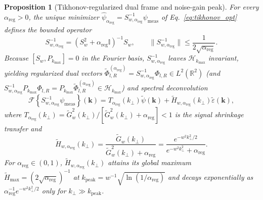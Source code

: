 \documentclass[aps,pra,reprint,nofootinbib,floatfix,longbibliography]{revtex4-2}
\newtheorem{proposition}{Proposition}
\theoremstyle{remark}
\newcommand{\norm}[1]{\lVert #1 \rVert}
\begin{document}
\begin{proposition}[Tikhonov-regularized dual frame and noise-gain peak]
\label{prop:tikhonov_dual}
For every $\alpha_{\mathrm{reg}} > 0$, the unique minimizer $\hat{\psi}_{\alpha_{\mathrm{reg}}} = S_{w,\alpha_{\mathrm{reg}}}^{-1}\psi_{\mathrm{meas}}$ of Eq.~\eqref{eq:tikhonov_opt} defines the bounded operator
\begin{equation}
S_{w,\alpha_{\mathrm{reg}}}^{-1} = \left(S_w^2 + \alpha_{\mathrm{reg}}\mathbb{I}\right)^{-1} S_w, \qquad \norm{S_{w,\alpha_{\mathrm{reg}}}^{-1}} \le \frac{1}{2\sqrt{\alpha_{\mathrm{reg}}}}.
\label{eq:tikhonov_op_def}
\end{equation}
Because $[S_w, P_{k_{\max}}] = 0$ in the Fourier basis, $S_{w,\alpha_{\mathrm{reg}}}^{-1}$ leaves $\mathcal{H}_{k_{\max}}$ invariant, yielding regularized dual vectors $\widetilde{\Phi}_{l,R}^{(\alpha_{\mathrm{reg}})} = S_{w,\alpha_{\mathrm{reg}}}^{-1}\Phi_{l,R} \in L^2(\mathbb{R}^2)$ (and $S_{w,\alpha_{\mathrm{reg}}}^{-1}P_{k_{\max}}\Phi_{l,R} = P_{k_{\max}}\widetilde{\Phi}_{l,R}^{(\alpha_{\mathrm{reg}})} \in \mathcal{H}_{k_{\max}}$) and spectral deconvolution
\begin{equation}
\mathcal{F}\!\left\{S_{w,\alpha_{\mathrm{reg}}}^{-1}\psi_{\mathrm{meas}}\right\}(\mathbf{k}) = T_{\alpha_{\mathrm{reg}}}(k_\perp)\widetilde{\psi}(\mathbf{k}) + \widetilde{H}_{w,\alpha_{\mathrm{reg}}}(k_\perp)\widetilde{\varepsilon}(\mathbf{k}),
\label{eq:synth_multiplier}
\end{equation}
where $T_{\alpha_{\mathrm{reg}}}(k_\perp) = \widetilde{G}_w^2(k_\perp)/[\widetilde{G}_w^2(k_\perp) + \alpha_{\mathrm{reg}}] < 1$ is the signal shrinkage transfer and
\begin{equation}
\widetilde{H}_{w,\alpha_{\mathrm{reg}}}(k_\perp) = \frac{\widetilde{G}_w(k_\perp)}{\widetilde{G}_w^2(k_\perp) + \alpha_{\mathrm{reg}}} = \frac{e^{-w^2 k_\perp^2/2}}{e^{-w^2 k_\perp^2} + \alpha_{\mathrm{reg}}}.
\label{eq:noise_multiplier}
\end{equation}
For $\alpha_{\mathrm{reg}} \in (0,1)$, $\widetilde{H}_{w,\alpha_{\mathrm{reg}}}(k_\perp)$ attains its global maximum $\widetilde{H}_{\max} = (2\sqrt{\alpha_{\mathrm{reg}}})^{-1}$ at $k_{\mathrm{peak}} = w^{-1}\sqrt{\ln(1/\alpha_{\mathrm{reg}})}$ and decays exponentially as $\alpha_{\mathrm{reg}}^{-1} e^{-w^2 k_\perp^2/2}$ only for $k_\perp \gg k_{\mathrm{peak}}$.
\end{proposition}
\end{document}
